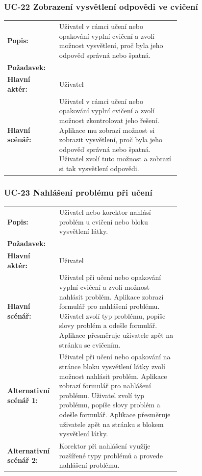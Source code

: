 \subsubsection{UC-22 Zobrazení vysvětlení odpovědi ve cvičení}

\begin{tabular}{lp{0.7\linewidth}}
  \textbf{Popis:} & Uživatel v rámci učení nebo opakování vyplní cvičení a zvolí možnost vysvětlení, proč byla jeho odpověď správná nebo špatná. \\
  \textbf{Požadavek:} & \nameref{sec:fp-answer-explanation} \\
  \textbf{Hlavní aktér:} & Uživatel \\
  \textbf{Hlavní scénář:} & Uživatel v rámci učení nebo opakování vyplní cvičení a zvolí možnost zkontrolovat jeho řešení. Aplikace mu zobrazí možnost si zobrazit vysvětlení, proč byla jeho odpověď správná nebo špatná. Uživatel zvolí tuto možnost a zobrazí si tak vysvětlení odpovědi.\\
\end{tabular}

\subsubsection{UC-23 Nahlášení problému při učení}

\begin{tabular}{lp{0.7\linewidth}}
  \textbf{Popis:} & Uživatel nebo korektor nahlásí problém u cvičení nebo bloku vysvětlení látky. \\
  \textbf{Požadavek:} & \nameref{sec:fp-report-learning-issue} \\
  \textbf{Hlavní aktér:} & Uživatel \\
  \textbf{Hlavní scénář:} & Uživatel při učení nebo opakování vyplní cvičení a zvolí možnost nahlásit problém. Aplikace zobrazí formulář pro nahlášení problému. Uživatel zvolí typ problému, popíše slovy problém a odešle formulář. Aplikace přesměruje uživatele zpět na stránku se cvičením. \\
  \textbf{Alternativní scénář 1:} & Uživatel při učení nebo opakování na stránce bloku vysvětlení látky zvolí možnost nahlásit problém. Aplikace zobrazí formulář pro nahlášení problému. Uživatel zvolí typ problému, popíše slovy problém a odešle formulář. Aplikace přesměruje uživatele zpět na stránku s blokem vysvětlení látky. \\
  \textbf{Alternativní scénář 2:} & Korektor při nahlášení využije rozšířené typy problémů a provede nahlášení problému. \\
\end{tabular}

